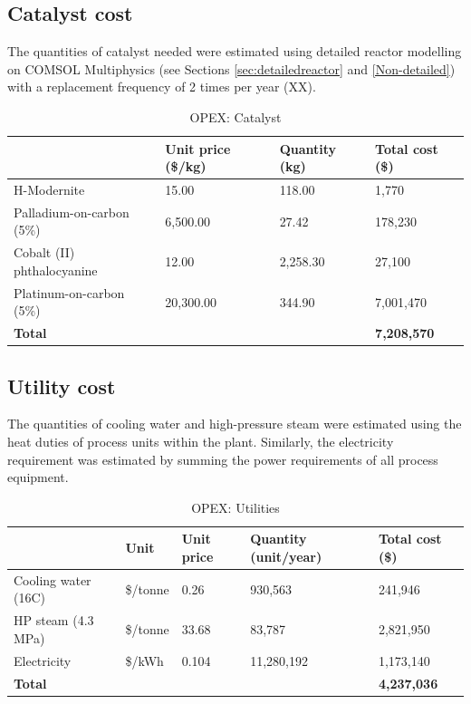 \subsection{Catalyst cost}
 The quantities of catalyst needed were estimated using detailed reactor modelling on COMSOL Multiphysics (see Sections \ref{sec:detailedreactor} and \ref{Non-detailed}) with a replacement frequency of 2 times per year (XX).

\begin{table}[H]
\centering
\caption{OPEX: Catalyst}
\label{tab:opex-catalyst}
\begin{tabular}{llll}
\toprule
\textbf{}                  & \textbf{Unit price (\$/kg)} & \textbf{Quantity (kg)} & \textbf{Total cost (\$)} \\ \midrule
H-Modernite                & 15.00                       & 118.00                 & 1,770                    \\
Palladium-on-carbon (5\%)  & 6,500.00                    & 27.42                  & 178,230                  \\
Cobalt (II) phthalocyanine & 12.00                       & 2,258.30               & 27,100                   \\
Platinum-on-carbon (5\%)   & 20,300.00                   & 344.90                 & 7,001,470                \\ 
\textbf{Total}             &                             &                        & \textbf{7,208,570}  \\\bottomrule    
\end{tabular}
\end{table}

\subsection{Utility cost}
 The quantities of cooling water and high-pressure steam were estimated using the heat duties of process units within the plant. Similarly, the electricity requirement was estimated by summing the power requirements of all process equipment.
 \begin{table}[H]
\centering
\caption{OPEX: Utilities}
\label{tab:opex-utilities}
\begin{tabular}{lllll}
\toprule
\textbf{}            & \textbf{Unit} & \textbf{Unit price} & \textbf{Quantity (unit/year)} & \textbf{Total cost (\$)} \\\midrule
Cooling water  (16C) & \$/tonne      & 0.26                & 930,563                       & 241,946                  \\
HP steam (4.3 MPa)   & \$/tonne      & 33.68               & 83,787                        & 2,821,950                \\
Electricity          & \$/kWh        & 0.104               & 11,280,192                    & 1,173,140                \\
\textbf{Total}       & \textbf{}     & \textbf{}           & \textbf{}                     & \textbf{4,237,036}      \\\bottomrule
\end{tabular}
\end{table}

